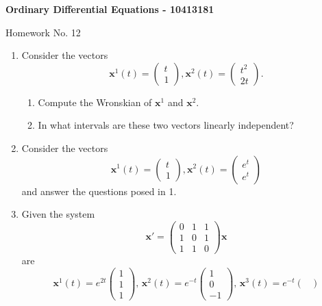 \documentclass[10pt,a4paper]{letter}
\begin{document}
\begin{center}
\begin{Large}
\textbf{Ordinary Differential Equations - 10413181}\\
\end{Large}
\vspace{1em}
\begin{large}Homework No. 12\end{large}
\end{center}

\begin{enumerate}
\item Consider the vectors
\[ \mathbf{x}^1(t) = \begin{pmatrix}
t \\
1
\end{pmatrix}, 
\mathbf{x}^2(t) = \begin{pmatrix}
t^2 \\
2t
\end{pmatrix}.\]
\begin{enumerate}
\item Compute the Wronskian of $\mathbf{x}^1$ and $\mathbf{x}^2.$
\item In what intervals are these two vectors linearly independent?
\end{enumerate}
\item Consider the vectors 
\[ \mathbf{x}^1(t) = \begin{pmatrix}
t \\
1
\end{pmatrix}, 
\mathbf{x}^2(t) = \begin{pmatrix}
e^t \\
e^t
\end{pmatrix}\]
and answer the questions posed in 1.
\item Given the system 
\[ \mathbf{x}' = \begin{pmatrix}
0 & 1 & 1 \\
1 & 0 & 1 \\
1 & 1 & 0 
\end{pmatrix} \mathbf{x} \]
are 
\[ \mathbf{x}^1(t) = e^{2t} \begin{pmatrix}
1 \\
1 \\
1 
\end{pmatrix}, \, \mathbf{x}^2(t) = e^{-t} \begin{pmatrix}
1 \\
0 \\
-1 
\end{pmatrix}, \,
\mathbf{x}^3(t) = e^{-t} \begin{pmatrix}

\end{pmatrix}\]
\end{enumerate}
\end{document}
